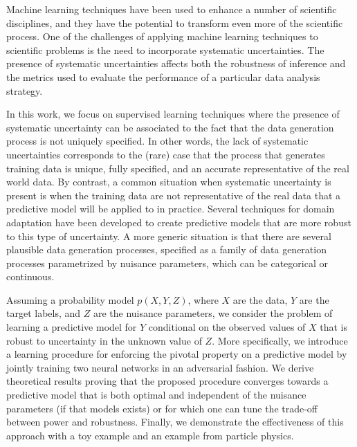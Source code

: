 \documentclass{article}
\theoremstyle{plain}
\begin{document}
Machine learning techniques have been used to enhance a number of scientific
disciplines, and they have the potential to transform even more of the
scientific process. One of the challenges of applying machine learning
techniques to scientific problems is the need to incorporate systematic
uncertainties. The presence of systematic uncertainties affects both the
robustness of inference and the metrics used to evaluate the performance of a
particular data analysis strategy.

In this work, we focus on supervised learning techniques where the presence of
systematic uncertainty can be associated to the fact that the data generation
process is not uniquely specified. In other words, the lack of systematic
uncertainties corresponds to the (rare) case that the process that generates
training data is unique, fully specified, and an accurate representative of the
real world data. By contrast, a common situation when systematic uncertainty is
present is when the training data are not representative of the real data that a
predictive model will be applied to in practice. Several techniques for domain
adaptation have been developed to create predictive models that are more robust
to this type of uncertainty. A more generic situation is that there are several
plausible data generation processes, specified as a family of data generation
processes parametrized by nuisance parameters, which can be categorical or
continuous.

Assuming a probability model $p(X,Y,Z)$, where $X$ are the data, $Y$ are the
target labels, and $Z$ are the nuisance parameters, we consider the problem of
learning a predictive model for $Y$ conditional on the observed values of $X$
that is robust to uncertainty in the unknown value of $Z$. More specifically, we
introduce a learning procedure for enforcing the pivotal property
\citep{degroot1986probability}  on a
predictive model by jointly training two neural networks in an adversarial
fashion. We derive theoretical results proving that the proposed procedure
converges towards a predictive model that is both optimal and independent of the
nuisance parameters (if that models exists) or for which one can tune the
trade-off between power and robustness. Finally, we demonstrate the
effectiveness of this approach with a toy example and an example from particle physics.
\end{document}
